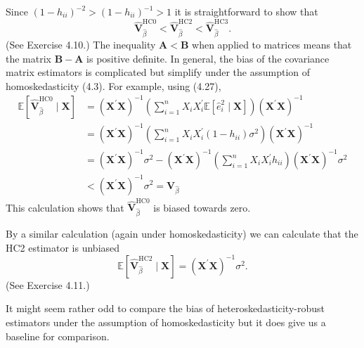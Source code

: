 \documentclass[10pt]{article}
\begin{document}
Since $\left(1-h_{i i}\right)^{-2}>\left(1-h_{i i}\right)^{-1}>1$ it is straightforward to show that
$$
\widehat{\boldsymbol{V}}_{\widehat{\beta}}^{\mathrm{HC} 0}<\widehat{\boldsymbol{V}}_{\widehat{\beta}}^{\mathrm{HC} 2}<\widehat{\boldsymbol{V}}_{\widehat{\beta}}^{\mathrm{HC} 3} .
$$
(See Exercise 4.10.) The inequality $\boldsymbol{A}<\boldsymbol{B}$ when applied to matrices means that the matrix $\boldsymbol{B}-\boldsymbol{A}$ is positive definite. In general, the bias of the covariance matrix estimators is complicated but simplify under the assumption of homoskedasticity (4.3). For example, using (4.27),
$$
\begin{aligned}
\mathbb{E}\left[\widehat{\boldsymbol{V}}_{\widehat{\beta}}^{\mathrm{HC} 0} \mid \boldsymbol{X}\right] &=\left(\boldsymbol{X}^{\prime} \boldsymbol{X}\right)^{-1}\left(\sum_{i=1}^{n} X_{i} X_{i}^{\prime} \mathbb{E}\left[\widehat{e}_{i}^{2} \mid \boldsymbol{X}\right]\right)\left(\boldsymbol{X}^{\prime} \boldsymbol{X}\right)^{-1} \\
&=\left(\boldsymbol{X}^{\prime} \boldsymbol{X}\right)^{-1}\left(\sum_{i=1}^{n} X_{i} X_{i}^{\prime}\left(1-h_{i i}\right) \sigma^{2}\right)\left(\boldsymbol{X}^{\prime} \boldsymbol{X}\right)^{-1} \\
&=\left(\boldsymbol{X}^{\prime} \boldsymbol{X}\right)^{-1} \sigma^{2}-\left(\boldsymbol{X}^{\prime} \boldsymbol{X}\right)^{-1}\left(\sum_{i=1}^{n} X_{i} X_{i}^{\prime} h_{i i}\right)\left(\boldsymbol{X}^{\prime} \boldsymbol{X}\right)^{-1} \sigma^{2} \\
&<\left(\boldsymbol{X}^{\prime} \boldsymbol{X}\right)^{-1} \sigma^{2}=\boldsymbol{V}_{\widehat{\beta}}
\end{aligned}
$$
This calculation shows that $\widehat{\boldsymbol{V}}_{\widehat{\beta}}^{\mathrm{HC} 0}$ is biased towards zero.

By a similar calculation (again under homoskedasticity) we can calculate that the HC2 estimator is unbiased
$$
\mathbb{E}\left[\widehat{\boldsymbol{V}}_{\widehat{\beta}}^{\mathrm{HC} 2} \mid \boldsymbol{X}\right]=\left(\boldsymbol{X}^{\prime} \boldsymbol{X}\right)^{-1} \sigma^{2} .
$$
(See Exercise 4.11.)

It might seem rather odd to compare the bias of heteroskedasticity-robust estimators under the assumption of homoskedasticity but it does give us a baseline for comparison.
\end{document}
